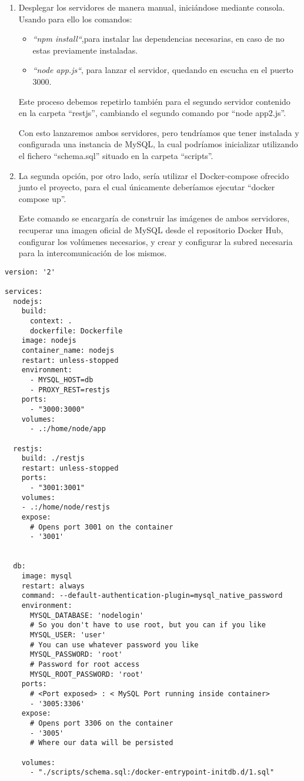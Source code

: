  \begin{enumerate}
    \item Desplegar los servidores de manera manual, iniciándose mediante consola. Usando para ello los comandos:

          \begin{itemize}
            \item \textit{“npm install“},para instalar las dependencias necesarias, en caso de no estas previamente instaladas.
            \item \textit{“node app.js“}, para lanzar el servidor, quedando en escucha en el puerto 3000.
          \end{itemize}
          Este proceso debemos repetirlo también para el segundo servidor contenido en la carpeta “restjs”, cambiando el segundo comando por “node app2.js”.
    
          Con esto lanzaremos ambos servidores, pero tendríamos que tener instalada y configurada una instancia de MySQL, la cual podríamos inicializar utilizando el fichero “schema.sql” situado en la carpeta “scripts”.
    
     \item La segunda opción, por otro lado, sería utilizar el Docker-compose ofrecido junto el proyecto, para el cual únicamente deberíamos ejecutar “docker compose up”.
     
          Este comando se encargaría de construir las imágenes de ambos servidores, recuperar una imagen oficial de MySQL desde el repositorio Docker Hub, configurar los volúmenes necesarios, y crear y configurar la subred necesaria para la intercomunicación de los mismos.
     

  \end{enumerate}

\begin{lstlisting}
version: '2'

services:
  nodejs:
    build:
      context: .
      dockerfile: Dockerfile
    image: nodejs
    container_name: nodejs
    restart: unless-stopped
    environment:
      - MYSQL_HOST=db
      - PROXY_REST=restjs
    ports:
      - "3000:3000"
    volumes:
      - .:/home/node/app
  
  restjs:
    build: ./restjs
    restart: unless-stopped
    ports:
      - "3001:3001"
    volumes:
    - .:/home/node/restjs 
    expose:
      # Opens port 3001 on the container
      - '3001'  
   

  db:
    image: mysql
    restart: always
    command: --default-authentication-plugin=mysql_native_password
    environment:
      MYSQL_DATABASE: 'nodelogin'
      # So you don't have to use root, but you can if you like
      MYSQL_USER: 'user'
      # You can use whatever password you like
      MYSQL_PASSWORD: 'root'
      # Password for root access
      MYSQL_ROOT_PASSWORD: 'root'
    ports:
      # <Port exposed> : < MySQL Port running inside container>
      - '3005:3306'
    expose:
      # Opens port 3306 on the container
      - '3005'
      # Where our data will be persisted
    
    volumes:
      - "./scripts/schema.sql:/docker-entrypoint-initdb.d/1.sql"

\end{lstlisting}

